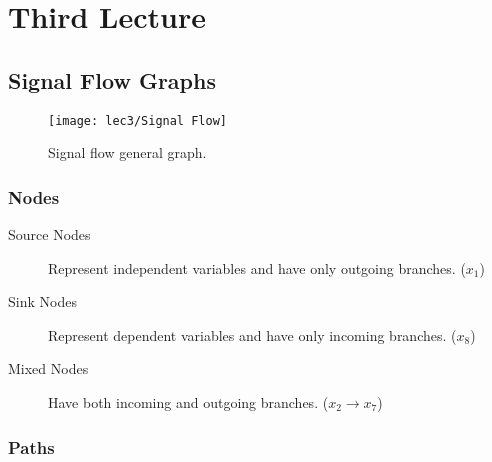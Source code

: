 \setchapterpreamble[u]{\margintoc}
\chapter{Third Lecture}


\section{Signal Flow Graphs}

\begin{figure}[h]
	\texttt{[image: lec3/Signal Flow]}
	\caption{Signal flow general graph.}
\end{figure}

\subsection[Nodes]{Nodes}

\begin{description}
	\item[Source Nodes]  Represent independent variables and have only outgoing branches. ($x_1$)
	\item[Sink Nodes]  Represent dependent variables and have only incoming branches. ($x_8$)
	\item[Mixed Nodes]  Have both incoming and outgoing branches. ($x_2 \to x_7$)
\end{description}

\subsection[Paths]{Paths}


